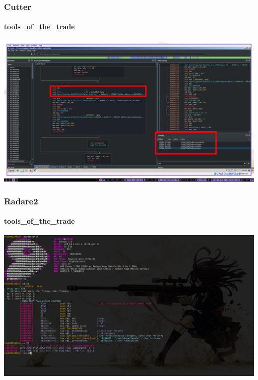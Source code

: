 \documentclass[aspectratio=169]{beamer}
\begin{document}
\begin{frame}
  \frametitle{Cutter}
  \framesubtitle{tools\_of\_the\_trade}
  \begin{center}
    \includegraphics[scale=0.75]{cutter-navigation}
  \end{center}
\end{frame}

\begin{frame}
  \frametitle{Radare2}
  \framesubtitle{tools\_of\_the\_trade}
  \begin{center}
    \includegraphics[scale=0.18]{radare2}
  \end{center}
\end{frame}
\end{document}
